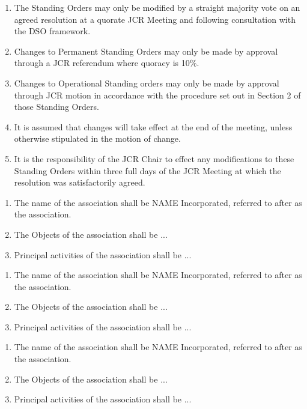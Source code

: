 \begin{enumerate}
    \item The Standing Orders may only be modified by a straight majority vote on an agreed resolution at a quorate JCR Meeting and following consultation with the DSO framework.
    \item Changes to Permanent Standing Orders may only be made by approval through a JCR referendum where quoracy is 10\%.
    \item Changes to Operational Standing orders may only be made by approval through JCR motion in accordance with the procedure set out in Section 2 of those Standing Orders. %
    \item It is assumed that changes will take effect at the end of the meeting, unless otherwise stipulated in the motion of change.
    \item It is the responsibility of the JCR Chair to effect any modifications to these Standing Orders within three full days of the JCR Meeting at which the resolution was satisfactorily agreed. %
\end{enumerate}

\begin{enumerate}
    \item The name of the association shall be NAME Incorporated, referred to after as the association.
    \item The Objects of the association shall be ...
    \item Principal activities of the association shall be ...
\end{enumerate}

\begin{enumerate}
    \item The name of the association shall be NAME Incorporated, referred to after as the association.
    \item The Objects of the association shall be ...
    \item Principal activities of the association shall be ...
\end{enumerate}

\begin{enumerate}
    \item The name of the association shall be NAME Incorporated, referred to after as the association.
    \item The Objects of the association shall be ...
    \item Principal activities of the association shall be ...
\end{enumerate}

